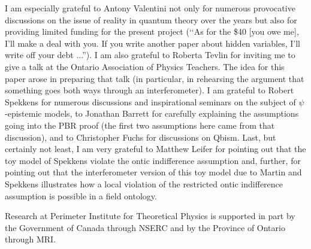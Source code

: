 \documentclass[12pt]{article}
\begin{document}
I am especially grateful to Antony Valentini not only for numerous provocative discussions on the issue of reality in quantum theory over the years but also for providing limited funding
for the present project (\lq\lq As for the \$40 [you owe me], I'll make a deal with you. If you write another paper about hidden variables, I'll write off your debt ...'').  I am also
grateful to Roberta Tevlin for inviting me to give a talk at the Ontario Association of Physics Teachers.  The idea for this paper arose in preparing that talk (in particular, in rehearsing
the argument that something goes both ways through an interferometer).  I am grateful to Robert Spekkens for numerous discussions and inspirational seminars on the subject of
$\psi$-epistemic models, to Jonathan Barrett for carefully explaining the assumptions going into the PBR proof (the first two assumptions here came from that discussion), and to Christopher Fuchs for discussions on Qbism.  Last, but certainly not least, I am very grateful to Matthew Leifer for pointing out that the toy model of Spekkens violate the ontic indifference assumption and, further, for pointing out that the interferometer version of this toy model due to Martin and Spekkens illustrates how a local violation of the restricted ontic indifference assumption is possible in a field ontology.  

Research at Perimeter Institute for Theoretical Physics is supported in part by the Government of Canada through NSERC and by the Province of Ontario through MRI.

\raggedright

 
\end{document}
